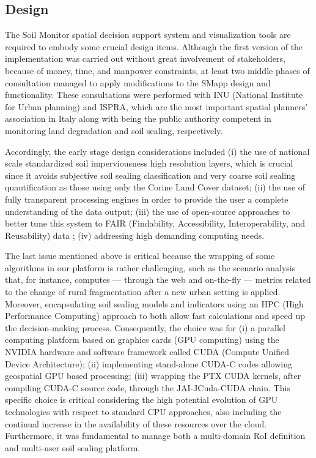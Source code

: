 \documentclass[APA,LATO1COL,doublespace]{WileyNJD-v2}
\begin{document}
\subsection{Design}
The Soil Monitor spatial decision support system and visualization tools are required to embody some crucial design items. 
Although the first version of the implementation was carried out without great involvement of stakeholders, because of money, time, and manpower constraints, at least two middle phases of consultation managed to apply modifications to the SMapp design and functionality. 
These consultations were performed with INU (National Institute for Urban planning) and ISPRA, which are the most important spatial planners' association in Italy along with being the public authority competent in monitoring land degradation and soil sealing, respectively.

Accordingly, the early stage design considerations included (i) the use of national scale standardized soil imperviousness high resolution layers, which is crucial since it avoids subjective soil sealing classification and very coarse soil sealing quantification as those using only the Corine Land Cover dataset; (ii) the use of fully transparent processing engines in order to provide the user a complete understanding of the data output; (iii) the use of open-source approaches to better tune this system to FAIR (Findability, Accessibility, Interoperability, and Reusability) data ; (iv) addressing high demanding computing needs.

The last issue mentioned above is critical because the wrapping of some algorithms in our platform is rather challenging, such as the scenario analysis that, for instance, computes --- through the web and on-the-fly --- metrics related to the change of rural fragmentation after a new urban setting is applied.
Moreover, encapsulating soil sealing models and indicators using an HPC (High Performance Computing) approach to both allow fast calculations and speed up the decision-making process. Consequently, the choice was for (i) a parallel computing platform based on graphics cards (GPU computing) using the NVIDIA hardware and software framework called CUDA (Compute Unified Device Architecture); (ii) implementing stand-alone CUDA-C codes allowing geospatial GPU based processing; (iii) wrapping the PTX CUDA kernels, after compiling CUDA-C source code, through the JAI-JCuda-CUDA chain. This specific choice is critical considering the high potential evolution of GPU technologies with respect to standard CPU approaches, also including the continual increase in the availability of these resources over the cloud. 
Furthermore, it was fundamental to manage both a multi-domain RoI definition and multi-user soil sealing platform.
\end{document}
